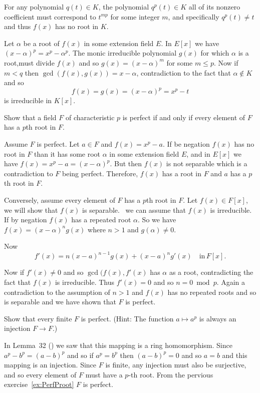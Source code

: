 \begin{myenumerate}
For any polynomial \(q(t)\in K\), the polynomial \(q^p(t)\in K\)
all of its nonzero coefficient must correspond
to \(t^{mp}\) for some integer $m$, and specifically \(q^p(t)\neq t\)
and thus \(f(x)\) has no root in $K$.

Let \(\alpha\) be a root of \(f(x)\) in some extension field $E$.
In \(E[x]\) we have \((x-\alpha)^p=x^p-\alpha^p\).
The monic irreducible polynomial \(g(x)\) for which \(\alpha\)
is a root,must divide \(f(x)\) and so \(g(x)=(x-\alpha)^m\)
for some \(m\leq p\).
Now if \(m<q\) then \(\gcd(f(x),g(x))=x-\alpha\), contradiction
to the fact that \(\alpha\notin K\) and so
\[f(x) = g(x) = (x - \alpha)^p = x^p - t\]
is irreducible in \(K[x]\).

\item
\begin{excopy}
Show that
\label{ex:PerfProot}
a field $F$ of characteristic $p$ is perfect if and only if
every element of $F$ has a $p$th root in $F$.
\end{excopy}

Assume $F$ is perfect. Let \(a\in F\) and
\(f(x)=x^p-a\).
If be negation \(f(x)\) has no root in $F$
than it has some root \(\alpha\) in some extension field $E$,
and in \(E[x]\) we have \(f(x) = x^p - a = (x - \alpha)^p\).
But then \(f(x)\) is not separable which is
a contradiction to $F$ being perfect. Therefore,
\(f(x)\) has a root in $F$ and $a$ has a $p$th root in $F$.

Conversely, assume every element of $F$ has a $p$th root in $F$.
Let \(f(x)\in F[x]\), we will show that \(f(x)\) is separable.
\Wlogy\ we can assume that \(f(x)\) is irreducible.
If by negation \(f(x)\) has a repeated root \(\alpha\).
So we have  \(f(x)=(x-\alpha)^n g(x)\) where \(n>1\) and
\(g(\alpha)\neq 0\).

Now
\begin{equation*}
 f'(x) = n(x-a)^{n-1}g(x) + (x-a)^n g'(x)  \quad\textrm{in}\, F[x].
\end{equation*}

Now if \(f'(x)\neq 0\) and so \(\gcd(f(x),f'(x)\) has \(\alpha\)
as a root, contradicting the fact that \(f(x)\) is irreducible.
Thus \(f'(x)=0\) and so \(n=0 \bmod p\).
Again a contradiction to the assumption of \(n>1\)
and \(f(x)\) has no repeated roots and so is separable
and we have shown that $F$ is perfect.


\item
\begin{excopy}
Show that every finite $F$ is perfect. (Hint:
The function \(a\mapsto a^p\) is always an injection \(F\rightarrow F\).)
\end{excopy}

In Lemma~32 (\cite{Rotman98}) we saw that this mapping
is a ring homomorphism. Since \(a^p-b^p = (a-b)^p\)
and so if \(a^p=b^p\) then \((a-b)^p=0\) and so \(a=b\)
and this mapping is an injection.
Since $F$ is finite, any injection must also be surjective,
and so every element of $F$ must have a $p$-th root.
From the pervious exercise~\ref{ex:PerfProot} $F$ is perfect.


\end{myenumerate}


